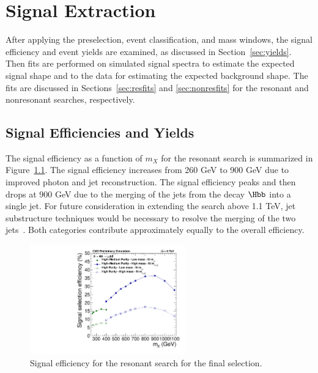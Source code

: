 \chapter{Signal Extraction\label{ch:signalextraction}}

After applying the preselection, event classification, and mass windows, the signal efficiency
and event yields are examined, as discussed in Section~\ref{sec:yields}. Then fits are performed
on simulated signal spectra to estimate the expected signal shape and to the data for estimating
the expected background shape. The fits are discussed in Sections~\ref{sec:resfits} and
\ref{sec:nonresfits} for the resonant and nonresonant searches, respectively.

\section{Signal Efficiencies and Yields\label{sec:yields}}

The signal efficiency as a function of $m_X$ for the resonant search is summarized in
Figure~\ref{fig:eff_res}. The signal efficiency increases from 260 GeV to 900 GeV
due to improved photon and jet reconstruction. The signal efficiency
peaks and then drops at 900 GeV due to the merging of the jets from the decay $\Hbb$ into
a single jet. For future consideration in extending the search above 1.1 TeV,
jet substructure techniques would be necessary to resolve the merging of the two
jets~\cite{Ellis:2009su}.
Both categories contribute approximately equally to the overall efficiency.

\begin{figure}[htbp!]
 \begin{center}
    \includegraphics[width=0.60\textwidth]{figures/results/eff_all.pdf}
      \end{center}
\caption{Signal efficiency for the resonant search for the final selection.}
\label{fig:eff_res}
\end{figure}

